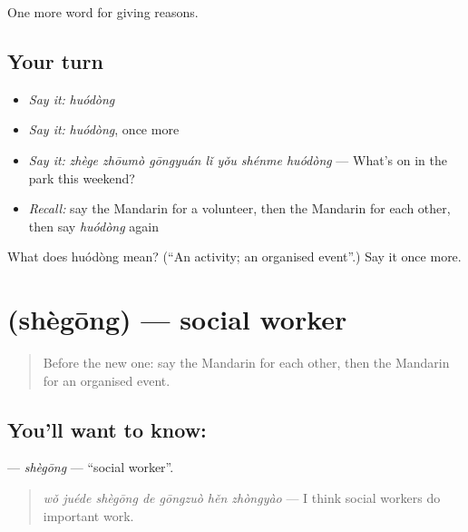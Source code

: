 \begin{grammarlens}[title={What you've built}]
One more word for giving reasons.
\end{grammarlens}

\subsection*{Your turn}
\begin{itemize}
\raggedright
  \item \emph{Say it:} \emph{huódòng}
  \item \emph{Say it:} \emph{huódòng}, once more
  \item \emph{Say it:} \emph{zhège zhōumò gōngyuán lǐ yǒu shénme huódòng} — What's on in the park this weekend?
  \item \emph{Recall:} say the Mandarin for a volunteer, then the Mandarin for each other, then say \emph{huódòng} again
\end{itemize}

\begin{tcolorbox}[breakable,colback=teal!4,colframe=teal!35!black,title={Before you move on}]
What does huódòng mean? (\textquotedblleft{}An activity; an organised event\textquotedblright{}.) Say it once more.
\end{tcolorbox}
\section[\texorpdfstring{\zh{社工} (shègōng)}{社工 (shègōng)}]{ (shègōng) — social worker}

\label{lesson:ZH-C376-shegong}



\begin{quote}
Before the new one: say the Mandarin for each other, then the Mandarin for an organised event.
\end{quote}

\subsection*{You'll want to know: }
\textbf{} — \emph{shègōng} — \textquotedblleft{}social worker\textquotedblright{}.

\begin{quote}
\textbf{} \emph{wǒ juéde shègōng de gōngzuò hěn zhòngyào} — I think social workers do important work.
\end{quote}


